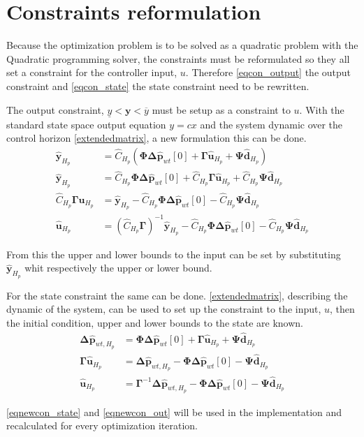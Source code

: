 
\section{Constraints reformulation}
\label{constraints_reformulation}

Because the optimization problem is to be solved as a quadratic problem with the Quadratic programming solver, the constraints must be reformulated so they all set a constraint for the controller input, $u$. Therefore \eqref{eqcon_output} the output constraint and \eqref{eqcon_state} the state constraint need to be rewritten. 

The output constraint, $\underline{y} < \bm{y} < \overline{y}$ must be setup as a constraint to $u$. With the standard state space output equation $y =c x$ and the system dynamic over the control horizon \eqref{extendedmatrix}, a new formulation this can be done.
%
\begin{align}
	\bm{\hat y}_{H_p} &= \hat C_{H_p} (\bm{\Phi} \bm{\Delta \hat{p}}_{wt}[0] + \bm{\Gamma} \bm{\hat{u}}_{H_p} + \bm{\Psi} \bm{\hat{d}}_{H_p}) \nonumber \\
% 
	\bm{\hat y}_{H_p} &= \hat C_{H_p}\bm{\Phi} \bm{\Delta \hat{p}}_{wt}[0] + \hat C_{H_p}\bm{\Gamma} \bm{\hat{u}}_{H_p} + \hat C_{H_p}\bm{\Psi} \bm{\hat{d}}_{H_p} \nonumber \\
%
	\hat C_{H_p}\bm{\Gamma} \bm{\hat{u}}_{H_p} &= \bm{\hat y}_{H_p} - \hat C_{H_p}\bm{\Phi} \bm{\Delta \hat{p}}_{wt}[0] - \hat C_{H_p}\bm{\Psi} \bm{\hat{d}}_{H_p} \nonumber \\
%
	\bm{\hat{u}}_{H_p} &= (\hat C_{H_p}\bm{\Gamma})^{-1}\bm{\hat y}_{H_p} - \hat C_{H_p}\bm{\Phi} \bm{\Delta \hat{p}}_{wt}[0] - \hat C_{H_p}\bm{\Psi} \bm{\hat{d}}_{H_p} \label{eqnewcon_out}
\end{align}

From this the upper and lower bounds to the input can be set by substituting $\bm{\hat y}_{H_p}$ whit respectively the upper or lower bound.

For the state constraint the same can be done. \eqref{extendedmatrix}, describing the dynamic of the system, can be used to set up the constraint to the input, $u$, then the initial condition, upper and lower bounds to the state are known. 
%
\begin{align}
	\bm{\Delta \hat{p}}_{wt,H_p} &= \bm{\Phi} \bm{\Delta \hat{p}}_{wt}[0] + \bm{\Gamma} \bm{\hat{u}}_{H_p} + \bm{\Psi} \bm{\hat{d}}_{H_p} \nonumber \\
%
	\bm{\Gamma} \bm{\hat{u}}_{H_p} &= \bm{\Delta \hat{p}}_{wt,H_p} - \bm{\Phi} \bm{\Delta \hat{p}}_{wt}[0] - \bm{\Psi} \bm{\hat{d}}_{H_p} \nonumber \\
%
	\bm{\hat{u}}_{H_p} &= \bm{\Gamma}^{-1} \bm{\Delta \hat{p}}_{wt,H_p} - \bm{\Phi} \bm{\Delta \hat{p}}_{wt}[0] - \bm{\Psi} \bm{\hat{d}}_{H_p} \label{eqnewcon_state}
\end{align}

\eqref{eqnewcon_state} and \eqref{eqnewcon_out} will be used in the implementation and recalculated for every optimization iteration. 
